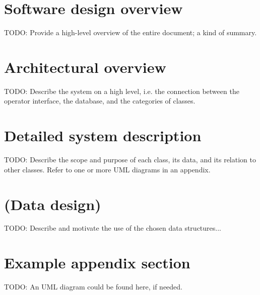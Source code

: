 \documentclass[12pt,titlepage]{article}
\begin{document}

\section{Software design overview}

TODO: Provide a high-level overview of the entire document; a kind of summary.

\section{Architectural overview}
\label{sec:architectural-overview}

TODO: Describe the system on a high level, i.e. the connection between the
operator interface, the database, and the categories of classes.

\section{Detailed system description}
\label{sec:detailed-system-description}

TODO: Describe the scope and purpose of each class, its data, and its relation
to other classes. Refer to one or more UML diagrams in an appendix.

\section{(Data design)}
\label{sec:data-design}

TODO: Describe and motivate the use of the chosen data structures...



\newpage
\appendix

\section{Example appendix section}
\label{app:example-appendix-section}

TODO: An UML diagram could be found here, if needed.
\end{document}
